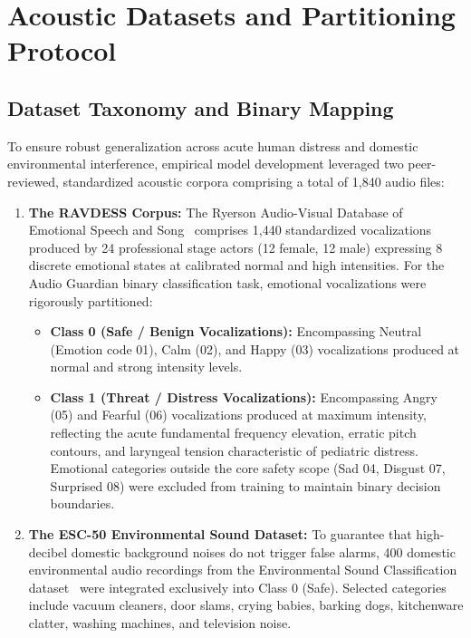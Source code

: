 \documentclass[12pt, a4paper]{report}
\begin{document}
\section{Acoustic Datasets and Partitioning Protocol}

\subsection{Dataset Taxonomy and Binary Mapping}
To ensure robust generalization across acute human distress and domestic environmental interference, empirical model development leveraged two peer-reviewed, standardized acoustic corpora comprising a total of 1,840 audio files:
\begin{enumerate}
    \item \textbf{The RAVDESS Corpus:} The Ryerson Audio-Visual Database of Emotional Speech and Song~\cite{ref_livingstone2018} comprises 1,440 standardized vocalizations produced by 24 professional stage actors (12 female, 12 male) expressing 8 discrete emotional states at calibrated normal and high intensities. For the Audio Guardian binary classification task, emotional vocalizations were rigorously partitioned:
    \begin{itemize}
        \item \textbf{Class 0 (Safe / Benign Vocalizations):} Encompassing Neutral (Emotion code 01), Calm (02), and Happy (03) vocalizations produced at normal and strong intensity levels.
        \item \textbf{Class 1 (Threat / Distress Vocalizations):} Encompassing Angry (05) and Fearful (06) vocalizations produced at maximum intensity, reflecting the acute fundamental frequency elevation, erratic pitch contours, and laryngeal tension characteristic of pediatric distress. Emotional categories outside the core safety scope (Sad 04, Disgust 07, Surprised 08) were excluded from training to maintain binary decision boundaries.
    \end{itemize}
    \item \textbf{The ESC-50 Environmental Sound Dataset:} To guarantee that high-decibel domestic background noises do not trigger false alarms, 400 domestic environmental audio recordings from the Environmental Sound Classification dataset~\cite{ref_piczak2015} were integrated exclusively into Class 0 (Safe). Selected categories include vacuum cleaners, door slams, crying babies, barking dogs, kitchenware clatter, washing machines, and television noise.
\end{enumerate}
\end{document}

